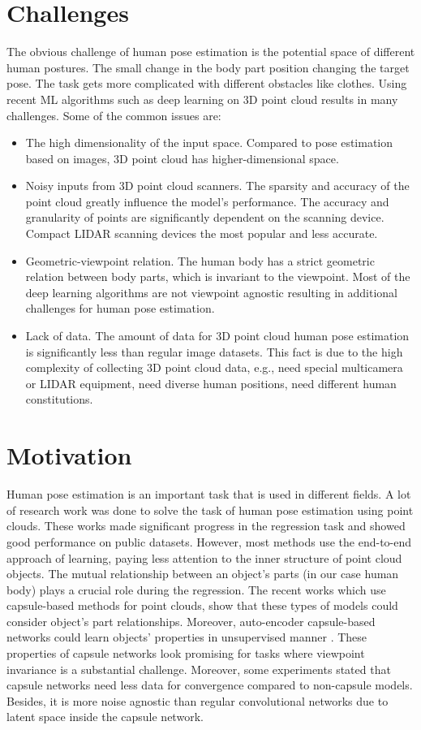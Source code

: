 \section{Challenges}
The obvious challenge of human pose estimation is the potential space of different human postures. The small change in the body part position changing the target pose. The task gets more complicated with different obstacles like clothes.
Using recent ML algorithms such as deep learning on 3D point cloud results in many challenges. Some of the common issues are:
\begin{itemize}
  \item The high dimensionality of the input space. Compared to pose estimation based on images, 3D point cloud has higher-dimensional space.
  \item Noisy inputs from 3D point cloud scanners. The sparsity and accuracy of the point cloud greatly influence the model's performance. The accuracy and granularity of points are significantly dependent on the scanning device. Compact LIDAR scanning devices the most popular and less accurate.
  \item Geometric-viewpoint relation. The human body has a strict geometric relation between body parts, which is invariant to the viewpoint. Most of the deep learning algorithms are not viewpoint agnostic resulting in additional challenges for human pose estimation.
  \item Lack of data. The amount of data for 3D point cloud human pose estimation is significantly less than regular image datasets. This fact is due to the high complexity of collecting 3D point cloud data, e.g., need special multicamera or LIDAR equipment, need diverse human positions, need different human constitutions.
\end{itemize}

\section{Motivation}
Human pose estimation is an important task that is used in different fields.
A lot of research work was done to solve the task of human pose estimation using point clouds. These works made significant progress in the regression task and showed good performance on public datasets. However, most methods use the end-to-end approach of learning, paying less attention to the inner structure of point cloud objects. The mutual relationship between an object's parts (in our case human body) plays a crucial role during the regression. 
The recent works \parencite{cheraghian_3dcapsule_2018,wu_3d_2020} which use capsule-based methods for point clouds, show that these types of models could consider object's part relationships. Moreover, auto-encoder capsule-based networks could learn objects' properties in unsupervised manner . These properties of capsule networks look promising for tasks where viewpoint invariance is a substantial challenge.
Moreover, some experiments \parencite{wang_capsule_2020,gritsevskiy_capsule_2018} stated that capsule networks need less data for convergence compared to non-capsule models. Besides, it is more noise agnostic than regular convolutional networks due to latent space inside the capsule network.


